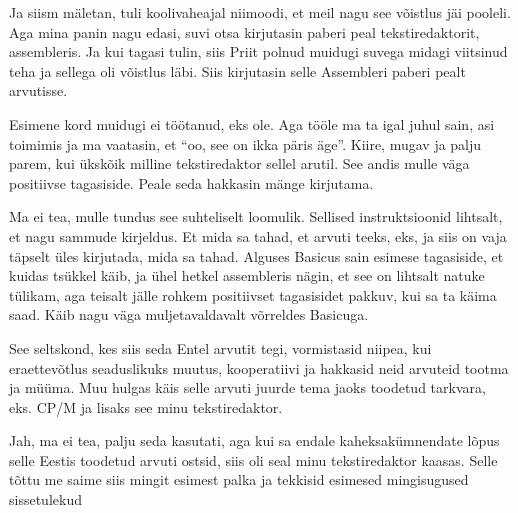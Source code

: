 Ja siism mäletan, tuli koolivaheajal niimoodi, et meil nagu see võistlus jäi pooleli. Aga mina panin nagu edasi, suvi otsa kirjutasin paberi peal tekstiredaktorit, assembleris. Ja kui tagasi tulin, siis Priit polnud muidugi suvega midagi viitsinud teha ja sellega oli võistlus läbi. Siis kirjutasin selle Assembleri paberi pealt arvutisse.


Esimene kord muidugi ei töötanud, eks ole. Aga tööle ma ta igal juhul sain, asi toimimis ja ma vaatasin, et \enquote{oo, see on ikka päris äge}. Kiire, mugav ja palju parem, kui ükskõik milline tekstiredaktor sellel arutil. See andis mulle väga positiivse tagasiside. Peale seda hakkasin mänge kirjutama.


Ma ei tea, mulle tundus see suhteliselt loomulik. Sellised instruktsioonid lihtsalt, et nagu sammude kirjeldus. Et mida sa tahad, et arvuti teeks, eks, ja siis on vaja täpselt üles kirjutada, mida sa tahad. Alguses Basicus sain esimese tagasiside, et kuidas tsükkel käib, ja ühel hetkel assembleris nägin, et see on lihtsalt natuke tülikam, aga teisalt jälle rohkem positiivset tagasisidet pakkuv, kui sa ta käima saad. Käib nagu väga muljetavaldavalt võrreldes Basicuga. 


See seltskond, kes siis seda Entel arvutit tegi, vormistasid niipea, kui eraettevõtlus seaduslikuks muutus, kooperatiivi ja hakkasid  neid arvuteid tootma ja müüma. Muu hulgas käis selle arvuti juurde tema jaoks toodetud tarkvara, eks. CP/M ja  lisaks see minu tekstiredaktor.


Jah, ma ei tea, palju seda kasutati, aga kui sa endale kaheksakümnendate lõpus selle Eestis toodetud arvuti ostsid, siis oli seal minu tekstiredaktor kaasas. Selle tõttu me saime siis mingit esimest palka ja tekkisid esimesed mingisugused sissetulekud


